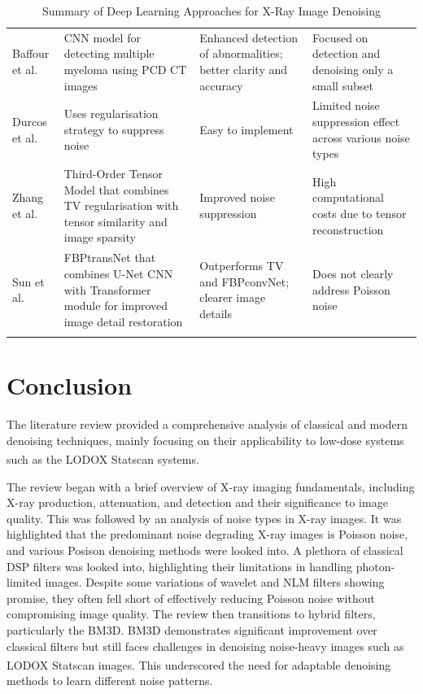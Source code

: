 \begin{center}
\begin{longtable}{ p{}  p{}   p{}   p{} }
\rowcolor[HTML]{F3F3F3} 
Baffour et al. \cite{baffour_photon-counting_2023} & \gls{CNN} model for detecting multiple myeloma using \gls{PCD} \gls{CT} images & Enhanced detection of abnormalities; better clarity and accuracy & Focused on detection and denoising only a small subset \\
\rowcolor[HTML]{FFFFFF} 
Durcos et al. \cite{ducros2017regularization} & Uses regularisation strategy to suppress noise & Easy to implement & Limited noise suppression effect across various noise types \\
\rowcolor[HTML]{F3F3F3} 
Zhang et al. \cite{zhang2020multi} & Third-Order Tensor Model that combines \gls{TV} regularisation with tensor similarity and image sparsity & Improved noise suppression & High computational costs due to tensor reconstruction \\
\rowcolor[HTML]{FFFFFF} 
Sun et al. \cite{sun_research_2024} & \gls{FBPtransNet} that combines \gls{U-Net} \gls{CNN} with Transformer module for improved image detail restoration & Outperforms \gls{TV} and \gls{FBPconvNet}; clearer image details & Does not clearly address Poisson noise \\

\caption{Summary of Deep Learning Approaches for X-Ray Image Denoising}
\label{tab:deeplearning}
\end{longtable}

\end{center}


\section{Conclusion}
The literature review provided a comprehensive analysis of classical and modern denoising techniques, mainly focusing on their applicability to low-dose systems such as the LODOX\textsuperscript{\textregistered} Statscan\textsuperscript{\textregistered} systems. 

The review began with a brief overview of X-ray imaging fundamentals, including X-ray production, attenuation, and detection and their significance to image quality. This was followed by an analysis of noise types in X-ray images. It was highlighted that the predominant noise degrading X-ray images is Poisson noise, and various Posison denoising methods were looked into. A plethora of classical \gls{DSP} filters was looked into, highlighting their limitations in handling photon-limited images. Despite some variations of wavelet and \gls{NLM} filters showing promise, they often fell short of effectively reducing Poisson noise without compromising image quality. The review then transitions to hybrid filters, particularly the \gls{BM3D}. \gls{BM3D} demonstrates significant improvement over classical filters but still faces challenges in denoising noise-heavy images such as LODOX\textsuperscript{\textregistered} Statscan\textsuperscript{\textregistered} images. This underscored the need for adaptable denoising methods to learn different noise patterns.

